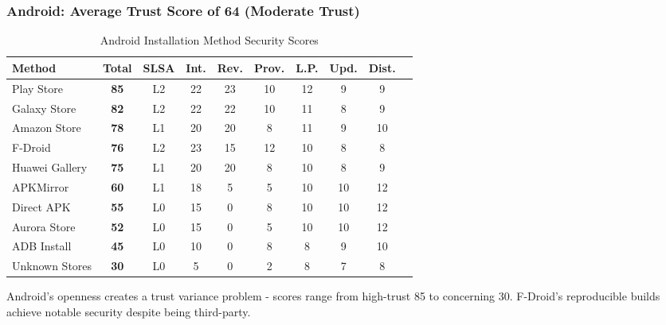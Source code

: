 \documentclass[11pt,a4paper]{article}
\begin{document}
\subsubsection{Android: Average Trust Score of 64 (Moderate Trust)}

\begin{table}[h]
\centering
\caption{Android Installation Method Security Scores}
\begin{tabular}{lccccccccc}
\toprule
\textbf{Method} & \textbf{Total} & \textbf{SLSA} & \textbf{Int.} & \textbf{Rev.} & \textbf{Prov.} & \textbf{L.P.} & \textbf{Upd.} & \textbf{Dist.} \\
\midrule
Play Store & \textbf{85} & L2 & 22 & 23 & 10 & 12 & 9 & 9 \\
Galaxy Store & \textbf{82} & L2 & 22 & 22 & 10 & 11 & 8 & 9 \\
Amazon Store & \textbf{78} & L1 & 20 & 20 & 8 & 11 & 9 & 10 \\
F-Droid & \textbf{76} & L2 & 23 & 15 & 12 & 10 & 8 & 8 \\
Huawei Gallery & \textbf{75} & L1 & 20 & 20 & 8 & 10 & 8 & 9 \\
APKMirror & \textbf{60} & L1 & 18 & 5 & 5 & 10 & 10 & 12 \\
Direct APK & \textbf{55} & L0 & 15 & 0 & 8 & 10 & 10 & 12 \\
Aurora Store & \textbf{52} & L0 & 15 & 0 & 5 & 10 & 10 & 12 \\
ADB Install & \textbf{45} & L0 & 10 & 0 & 8 & 8 & 9 & 10 \\
Unknown Stores & \textbf{30} & L0 & 5 & 0 & 2 & 8 & 7 & 8 \\
\bottomrule
\end{tabular}
\end{table}

Android's openness creates a trust variance problem - scores range from high-trust 85 to concerning 30. F-Droid's reproducible builds achieve notable security despite being third-party.
\end{document}

